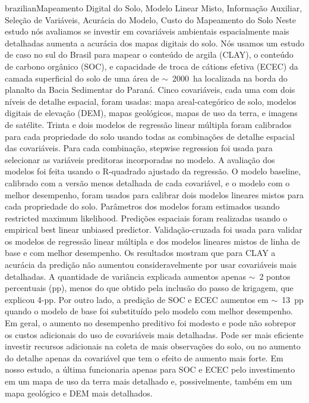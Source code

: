 \def\portuguesekeys{Mapeamento Digital do Solo, Modelo Linear Misto, Informação 
Auxiliar, Seleção de Variáveis, Acurácia do Modelo, Custo do Mapeamento do Solo}
\begin{chapterabstract}{brazilian}{\portuguesekeys}
Neste estudo nós avaliamos se investir em covariáveis ambientais espacialmente
mais detalhadas aumenta a acurácia dos mapas digitais do solo. Nós usamos um 
estudo de caso no sul do Brasil para mapear o conteúdo de argila (CLAY), o
conteúdo de carbono orgânico (SOC), e capacidade de troca de cátions efetiva 
(ECEC) da camada superficial do solo de uma área de $\sim$~2000~ha localizada
na borda do planalto da Bacia Sedimentar do Paraná. Cinco covariáveis, cada uma
com dois níveis de detalhe espacial, foram usadas: mapa areal-categórico de solo,
modelos digitais de elevação (DEM), mapas geológicos, mapas de uso da terra, e 
imagens de satélite. Trinta e dois modelos de regressão linear múltipla foram
calibrados para cada propriedade do solo usando todas as combinações de detalhe
espacial das covariáveis. Para cada combinação, stepwise regression foi usada 
para selecionar as variáveis preditoras incorporadas no modelo. A avaliação dos
modelos foi feita usando o R-quadrado ajustado da regressão. O modelo baseline, 
calibrado com a versão menos detalhada de cada covariável, e o modelo com o 
melhor desempenho, foram usados para calibrar dois modelos lineares mistos para
cada propriedade do solo. Parâmetros dos modelos foram estimados usando 
restricted maximum likelihood. Predições espaciais foram realizadas usando o 
empirical best linear unbiased predictor. Validação-cruzada foi usada para 
validar os modelos de regressão linear múltipla e dos modelos lineares mistos 
de linha de base e com melhor desempenho. Os resultados mostram que para CLAY a 
acurácia da predição não aumentou consideravelmente por usar covariáveis mais
detalhadas. A quantidade de variância explicada aumentos apenas $\sim$~2 pontos
percentuais (pp), menos do que obtido pela inclusão do passo de krigagem, que
explicou 4-pp. Por outro lado, a predição de SOC e ECEC aumentos em $\sim$~13~pp
quando o modelo de base foi substituído pelo modelo com melhor desempenho. Em 
geral, o aumento no desempenho preditivo foi modesto e pode não sobrepor os 
custos adicionais do uso de covariáveis mais detalhadas. Pode ser mais eficiente
investir recursos adicionais na coleta de mais observações do solo, ou no 
aumento do detalhe apenas da covariável que tem o efeito de aumento mais forte.
Em nosso estudo, a última funcionaria apenas para SOC e ECEC pelo investimento
em um mapa de uso da terra mais detalhado e, possivelmente, também em um mapa 
geológico e DEM mais detalhados.
\end{chapterabstract}

